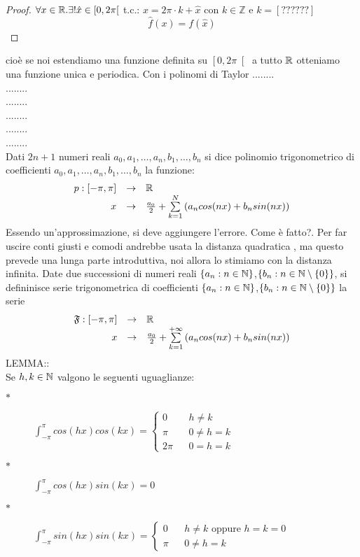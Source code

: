\begin{proof}
	$\forall x\in \mathbb{R}. \exists ! \hat{x}\in\left[0,2\pi\right[$ t.c.: $x=2\pi\cdot k+\hat{x}$ con $k\in\mathbb{Z}$ e $k=\left[??????\right]$
	\[\hat{f}(x)=f(\hat{x})\]
\end{proof}
cioè se noi estendiamo una funzione definita su $\left[0,2\pi\right[$ a tutto $ \mathbb{R}$ otteniamo una funzione unica e periodica.
\observation
Con i polinomi di Taylor ........\\
........\\
........\\
........\\
........\\
........\\
Dati $2n+1$ numeri reali $a_0,a_1,\dotsc,a_n,b_1,\dotsc,b_n$ si dice polinomio trigonometrico di coefficienti $a_0,a_1,\dotsc,a_n,b_1,\dotsc,b_n$ la funzione:
\[\begin{array}{rcl} p: \left[-\pi,\pi\right] & \to &  \mathbb{R} \\ x & \to & \frac{a_0}{2}+\sum\limits_{k=1}^{N}\left(a_ncos(nx)+b_nsin(nx)\right) \end{array}\]
\observation
Essendo un'approssimazione, si deve aggiungere l'errore. Come è fatto?. Per far uscire conti giusti e comodi andrebbe usata la distanza quadratica , ma questo prevede una lunga parte introduttiva, noi allora lo stimiamo con la distanza infinita.
Date due successioni di numeri reali $\left\{a_n:n\in\mathbb{N}\right\}$,$\left\{b_n:n\in\mathbb{N}\setminus\left\{0\right\}\right\}$, si defininisce serie trigonometrica di coefficienti  $\left\{a_n:n\in\mathbb{N}\right\}$,$\left\{b_n:n\in\mathbb{N}\setminus\left\{0\right\}\right\}$ la serie
\[\begin{array}{rcl} \mathfrak{F}: \left[-\pi,\pi\right] & \to &  \mathbb{R} \\ x & \to & \frac{a_0}{2}+\sum\limits_{k=1}^{+\infty}\left(a_ncos(nx)+b_nsin(nx)\right) \end{array}\]
LEMMA::\\
Se $h,k\in\mathbb{N}$ valgono le seguenti uguaglianze:
\begin{description}
	\item[$\ast$]
	$\int_{-\pi}^{\pi} cos(hx)cos(kx)=
	\left\{\begin{matrix}
	0 &&h\ne k\\\pi&&0\ne h=k\\2\pi&&0=h=k
	\end{matrix}\right.$
	\item[$\ast$] $\int_{-\pi}^{\pi}cos(hx)sin(kx)= 0 $
	\item[$\ast$]
	$\int_{-\pi}^{\pi}sin(hx)sin(kx)=
	\left\{\begin{matrix}
	0 &&h\ne k\text{ oppure }h=k=0\\ \pi&&0\ne h=k
	\end{matrix}\right.$
\end{description}
